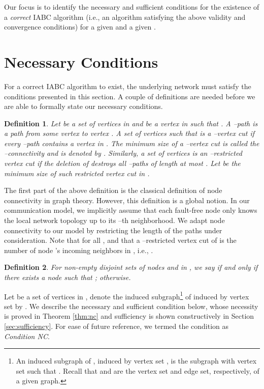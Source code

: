 \documentclass[letterpaper, 11pt]{article}
\newtheorem{definition}{Definition}[section]
\begin{document}
Our focus is to identify the necessary and sufficient
conditions for the existence of a {\em correct} IABC algorithm (i.e.,
an algorithm satisfying the above validity and convergence conditions)
for a given  and a given .






\section{Necessary Conditions}
\label{sec:necessary}

For a correct IABC algorithm to exist, the underlying network  must satisfy the conditions presented in this section. A couple of definitions are needed before we are able to formally state our necessary conditions.

\begin{definition}
Let  be a set of vertices in  and  be a vertex in  such that . A --path is a path from some vertex  to vertex . A set  of vertices such that  is a --\emph{vertex cut} if every --path contains a vertex in . The minimum size of a --vertex cut is called the --connectivity and is denoted by . Similarly, a set  of vertices is an --\emph{restricted vertex cut} if the deletion of  destroys all --paths of length at most . Let  be the minimum size of such restricted vertex cut in .
\end{definition}
The first part of the above definition is the classical definition of node connectivity in graph theory. However, this definition is a global notion. In our communication model, we implicitly assume that each fault-free node only knows the local network topology up to its --th neighborhood. We adapt node connectivity to our model by restricting the length of the paths under consideration. Note that  for all , and that a --restricted vertex cut of  is the number of node 's incoming neighbors in , i.e., .



\begin{definition}
For non-empty disjoint sets of nodes  and  in , we say
  if and only if
 there exists a node  such that ;
 otherwise.
\end{definition}

Let  be a set of vertices in , denote the induced subgraph\footnote{An induced subgraph of , induced by vertex set , is the subgraph  with vertex set  such that . Recall that  and  are the vertex set and edge set, respectively, of a given graph.} of  induced by vertex set  by . We describe the necessary and sufficient condition below, whose necessity is proved in Theorem \ref{thm:nc} and sufficiency is shown constructively in Section \ref{sec:sufficiency}. For ease of future reference, we termed the condition as \emph{Condition NC}.
\end{document}
